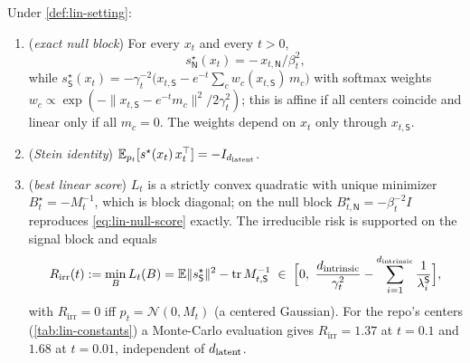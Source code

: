 \begin{lemma}\label{lem:null-exact-lin}
Under \cref{def:lin-setting}:
\begin{enumerate}
\item[(a)] (\emph{exact null block}) For every $x_t$ and every $t>0$,
\begin{equation}\label{eq:lin-null-score}
s^\star_{\mathsf N}(x_t)=-\,x_{t,\mathsf N}/\beta_t^2 ,
\end{equation}
while $s^\star_{\mathsf S}(x_t)=-\gamma_t^{-2}\big(x_{t,\mathsf S}-e^{-t}\sum_c w_c(x_{t,\mathsf S})\,m_c\big)$ with softmax weights $w_c\propto\exp(-\|x_{t,\mathsf S}-e^{-t}m_c\|^2/2\gamma_t^2)$; this is affine if all centers coincide and linear only if all $m_c=0$. The weights depend on $x_t$ only through $x_{t,\mathsf S}$.
\item[(b)] (\emph{Stein identity}) $\mathbb{E}_{p_t}[s^\star(x_t)\,x_t^{\top}]=-I_{d_{\mathrm{latent}}}$.
\item[(c)] (\emph{best linear score}) $L_t$ is a strictly convex quadratic with unique minimizer $B^\star_t=-M_t^{-1}$, which is block diagonal; on the null block $B^\star_{t,\mathsf N}=-\beta_t^{-2}I$ reproduces \eqref{eq:lin-null-score} exactly. The irreducible risk is supported on the signal block and equals
\begin{equation}\label{eq:lin-irr}
R_{\mathrm{irr}}(t):=\min_B L_t(B)=\E\|s^\star_{\mathsf S}\|^2-\operatorname{tr}M_{t,\mathsf S}^{-1}\;\in\;\Big[0,\ \frac{\dint}{\gamma_t^2}-\sum_{i=1}^{\dint}\frac1{\lambda^{\mathsf S}_i}\Big],
\end{equation}
with $R_{\mathrm{irr}}=0$ iff $p_t=\mathcal N(0,M_t)$ (a centered Gaussian). For the repo's centers (\cref{tab:lin-constants}) a Monte-Carlo evaluation gives $R_{\mathrm{irr}}=1.37$ at $t=0.1$ and $1.68$ at $t=0.01$, independent of $d_{\mathrm{latent}}$.
\end{enumerate}
\end{lemma}
